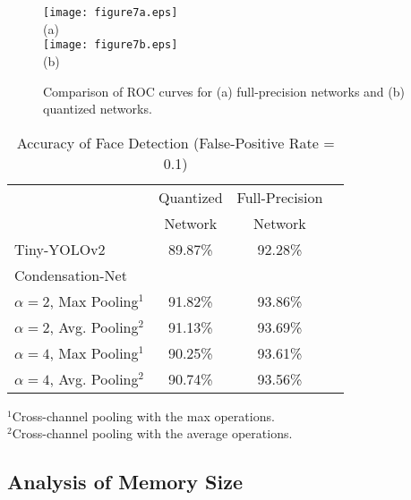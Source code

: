 \documentclass[10pt,twocolumn,letterpaper]{article}
\begin{document}
\begin{figure}[t]
\begin{center}
\texttt{[image: figure7a.eps]}\\
   (a)\\
   \texttt{[image: figure7b.eps]}\\
   (b)\\
\end{center}
   \caption{Comparison of ROC curves for (a) full-precision networks and (b) quantized networks.}
\label{fig:roc}
\end{figure}

\begin{table}
\begin{center}
\begin{tabular}{l|ccc}
\hline
           & Quantized & Full-Precision \\
           & Network   & Network \\
\hline\hline
Tiny-YOLOv2                        &  89.87\% & 92.28\% \\
\hline
Condensation-Net\\
$\alpha = 2$, Max Pooling$^{1}$    &  91.82\% & 93.86\% \\
$\alpha = 2$, Avg. Pooling$^{2}$   &  91.13\% & 93.69\% \\
$\alpha = 4$, Max Pooling$^{1}$    &  90.25\% & 93.61\% \\
$\alpha = 4$, Avg. Pooling$^{2}$   &  90.74\% & 93.56\% \\
\hline
\end{tabular}
\end{center}
{\small
$^{1}$Cross-channel pooling with the max operations.\\
$^{2}$Cross-channel pooling with the average operations.\\
}
\caption{Accuracy of Face Detection (False-Positive Rate = 0.1)}
\label{tab:accuracy}
\end{table}

\subsection{Analysis of Memory Size}
\label{subsec:memory}
\end{document}
